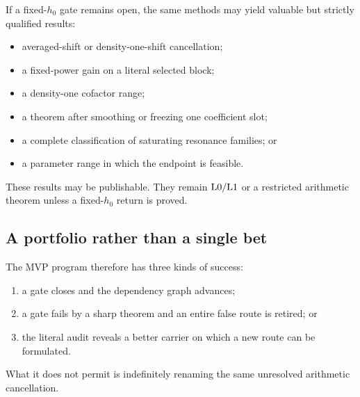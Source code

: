 If a fixed-\(h_0\) gate remains open, the same methods may yield
valuable but strictly qualified results:
\begin{itemize}[leftmargin=2em]
\item averaged-shift or density-one-shift cancellation;
\item a fixed-power gain on a literal selected block;
\item a density-one cofactor range;
\item a theorem after smoothing or freezing one coefficient slot;
\item a complete classification of saturating resonance families; or
\item a parameter range in which the endpoint is feasible.
\end{itemize}
These results may be publishable.  They remain \(\mathrm{L0}/\mathrm{L1}\) or a
restricted arithmetic theorem unless a fixed-\(h_0\) return is proved.

\subsection{A portfolio rather than a single bet}

The MVP program therefore has three kinds of success:
\begin{enumerate}[label=(\alph*),leftmargin=2em]
\item a gate closes and the dependency graph advances;
\item a gate fails by a sharp theorem and an entire false route is
  retired; or
\item the literal audit reveals a better carrier on which a new route
  can be formulated.
\end{enumerate}
What it does not permit is indefinitely renaming the same unresolved
arithmetic cancellation.
